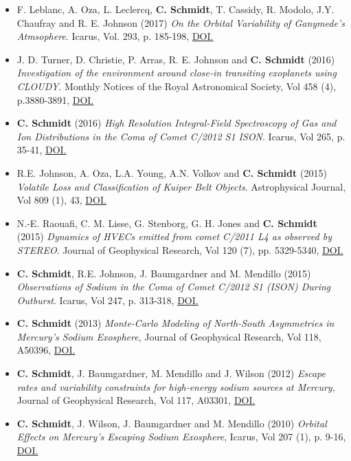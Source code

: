 \documentclass[12pt]{report}
\begin{document}
\begin{itemize}
  \item F. Leblanc, A. Oza, L. Leclercq, \textbf{C. Schmidt}, T. Cassidy, R. Modolo, J.Y. Chaufray and R. E. Johnson (2017) \textit{On the Orbital Variability of Ganymede's Atmsophere}. Icarus, Vol. 293, p. 185-198, \href{doi.org/10.1016/j.icarus.2017.04.025}{DOI.}
  \item J. D. Turner, D. Christie, P. Arras, R. E. Johnson and \textbf{C. Schmidt} (2016) \textit{Investigation of the environment around close-in transiting exoplanets using CLOUDY}. Monthly Notices of the Royal Astronomical Society, Vol 458 (4), p.3880-3891, \href{https://doi.org/10.1093/mnras/stw556}{DOI.}
  \item \textbf{C. Schmidt} (2016) \textit{High Resolution Integral-Field Spectroscopy of Gas and Ion Distributions in the Coma of Comet C/2012 S1 ISON}. Icarus, Vol 265, p. 35-41, \href{https://doi.org/10.1016/j.icarus.2015.10.009}{DOI.}
  \item R.E. Johnson, A. Oza, L.A. Young, A.N. Volkov and \textbf{C. Schmidt} (2015) \textit{Volatile Loss and Classification of Kuiper Belt Objects}. Astrophysical Journal, Vol 809 (1), 43, \href{https://doi.org/10.1088/0004-637X/809/1/43}{DOI.}
  \item N.-E. Raouafi, C. M. Lisse, G. Stenborg, G. H. Jones and \textbf{C. Schmidt} (2015) \textit{Dynamics of HVECs emitted from comet C/2011 L4 as observed by STEREO}. Journal of Geophysical Research, Vol 120 (7), pp. 5329-5340, \href{https://doi.org/10.1002/2014JA020926}{DOI.}
  \item \textbf{C. Schmidt}, R.E. Johnson, J. Baumgardner and M. Mendillo (2015) \textit{Observations of Sodium in the Coma of Comet C/2012 S1 (ISON) During Outburst}. Icarus, Vol 247, p. 313-318, \href{https://doi.org/10.1016/j.icarus.2014.10.022}{DOI.}
  \item \textbf{C. Schmidt} (2013) \textit{Monte-Carlo Modeling of North-South Asymmetries in Mercury's Sodium Exosphere}, Journal of Geophysical Research, Vol 118, A50396, \href{https://doi.org/10.1002/jgra.50396}{DOI.}
  \item \textbf{C. Schmidt}, J. Baumgardner, M. Mendillo and J. Wilson (2012) \textit{Escape rates and variability constraints for high-energy sodium sources at Mercury}, Journal of Geophysical Research, Vol 117, A03301, \href{https://doi.org/10.1029/2011JA017217}{DOI.}
  \item \textbf{C. Schmidt}, J. Wilson, J. Baumgardner and M. Mendillo (2010) \textit{Orbital Effects on Mercury's Escaping Sodium Exosphere}, Icarus, Vol 207 (1), p. 9-16, \href{https://doi.org/10.1016/j.icarus.2009.10.017}{DOI.}
 \end{itemize}
\end{document}
